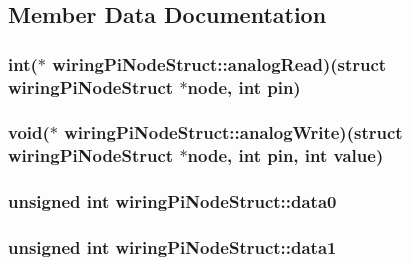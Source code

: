 \subsection{Member Data Documentation}
\hypertarget{structwiringPiNodeStruct_a9755fcb91cbac43810cf1fa1efd41f95}{
\subsubsection[{analog\-Read}]{\setlength{\rightskip}{0pt plus 5cm}int($\ast$ wiring\-Pi\-Node\-Struct\-::analog\-Read)(struct {\bf wiring\-Pi\-Node\-Struct} $\ast$node, int pin)}}\label{structwiringPiNodeStruct_a9755fcb91cbac43810cf1fa1efd41f95}
\hypertarget{structwiringPiNodeStruct_a4c62d270ac83831a01974c15db0df2e4}{
\subsubsection[{analog\-Write}]{\setlength{\rightskip}{0pt plus 5cm}void($\ast$ wiring\-Pi\-Node\-Struct\-::analog\-Write)(struct {\bf wiring\-Pi\-Node\-Struct} $\ast$node, int pin, int value)}}\label{structwiringPiNodeStruct_a4c62d270ac83831a01974c15db0df2e4}
\hypertarget{structwiringPiNodeStruct_a952b9e382a7031f1233a34ddb4d2e36b}{
\subsubsection[{data0}]{\setlength{\rightskip}{0pt plus 5cm}unsigned int wiring\-Pi\-Node\-Struct\-::data0}}\label{structwiringPiNodeStruct_a952b9e382a7031f1233a34ddb4d2e36b}
\hypertarget{structwiringPiNodeStruct_abde80f77b7c6c1178904c8748df379ad}{
\subsubsection[{data1}]{\setlength{\rightskip}{0pt plus 5cm}unsigned int wiring\-Pi\-Node\-Struct\-::data1}}\label{structwiringPiNodeStruct_abde80f77b7c6c1178904c8748df379ad}
